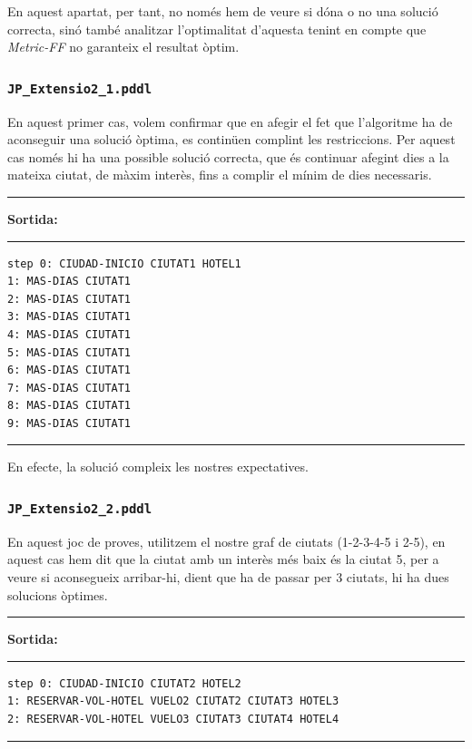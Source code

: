 \documentclass[11pt,a4paper]{article}
\begin{document}
En aquest apartat, per tant, no només hem de veure si dóna o no una solució correcta, sinó també analitzar l'optimalitat d'aquesta tenint en compte que \emph{Metric-FF} no garanteix el resultat òptim. 

\subsubsection*{\texttt{JP\_Extensio2\_1.pddl}}

En aquest primer cas, volem confirmar que en afegir el fet que l'algoritme ha de aconseguir una solució òptima, es continüen complint les restriccions. Per aquest cas només hi ha una possible solució correcta, que és continuar afegint dies a la mateixa ciutat, de màxim interès, fins a complir el mínim de dies necessaris.

\begin{samepage}
\medskip
\noindent
\rule{0.1\textwidth}{0.5mm}
\textbf{Sortida:}
\rule{0.76\textwidth}{0.5mm}
\begin{verbatim}
step 0: CIUDAD-INICIO CIUTAT1 HOTEL1
1: MAS-DIAS CIUTAT1
2: MAS-DIAS CIUTAT1
3: MAS-DIAS CIUTAT1
4: MAS-DIAS CIUTAT1
5: MAS-DIAS CIUTAT1
6: MAS-DIAS CIUTAT1
7: MAS-DIAS CIUTAT1
8: MAS-DIAS CIUTAT1
9: MAS-DIAS CIUTAT1
\end{verbatim}
\rule{\textwidth}{0.5mm}
\medskip
\end{samepage}

En efecte, la solució compleix les nostres expectatives.

\subsubsection*{\texttt{JP\_Extensio2\_2.pddl}}

En aquest joc de proves, utilitzem el nostre graf de ciutats (1-2-3-4-5 i 2-5), en aquest cas hem dit que la ciutat amb un interès més baix és la ciutat 5, per a veure si aconsegueix arribar-hi, dient que ha de passar per 3 ciutats, hi ha dues solucions òptimes.

\begin{samepage}
\medskip
\noindent
\rule{0.1\textwidth}{0.5mm}
\textbf{Sortida:}
\rule{0.76\textwidth}{0.5mm}
\begin{verbatim}
step 0: CIUDAD-INICIO CIUTAT2 HOTEL2
1: RESERVAR-VOL-HOTEL VUELO2 CIUTAT2 CIUTAT3 HOTEL3
2: RESERVAR-VOL-HOTEL VUELO3 CIUTAT3 CIUTAT4 HOTEL4
\end{verbatim}
\rule{\textwidth}{0.5mm}
\medskip
\end{samepage}
\end{document}
